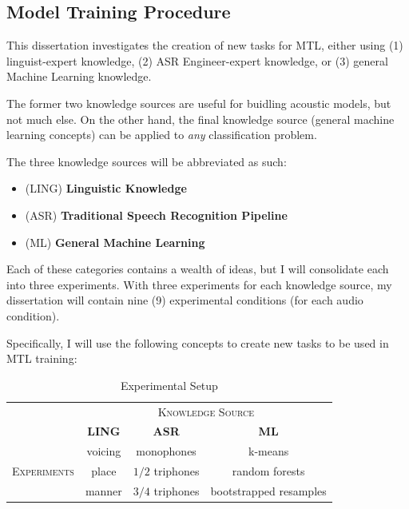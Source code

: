 \documentclass[10pt,a4paper]{article}
\begin{document}
\subsection{Model Training Procedure}

This dissertation investigates the creation of new tasks for MTL, either using (1) linguist-expert knowledge, (2) ASR Engineer-expert knowledge, or (3) general Machine Learning knowledge.

The former two knowledge sources are useful for buidling acoustic models, but not much else. On the other hand, the final knowledge source (general machine learning concepts) can be applied to \textit{any} classification problem.

The three knowledge sources will be abbreviated as such:
  
\begin{itemize}
\item  (\textsc{LING}) \textbf{Linguistic Knowledge} 
\item (\textsc{ASR}) \textbf{Traditional Speech Recognition Pipeline}
\item (\textsc{ML}) \textbf{General Machine Learning}
\end{itemize}


Each of these categories contains a wealth of ideas, but I will consolidate each into three experiments. With three experiments for each knowledge source, my dissertation will contain nine (9) experimental conditions (for each audio condition).

Specifically, I will use the following concepts to create new tasks to be used in MTL training:

\begin{table}[!htbp]
  \centering
  \begin{adjustbox}{width=.55\textwidth}
    \begin{tabular}{cccc}
      \toprule
      & \multicolumn{3}{c}{\textsc{Knowledge Source}}\\
      & \textbf{LING} & \textbf{ASR} & \textbf{ML}\\
      \midrule
      \multirow{3}{*}{\textsc{Experiments}} & voicing & monophones &  k-means \\
      & place & $1/2$ triphones & random forests  \\
      & manner & $3/4$ triphones &  bootstrapped resamples  \\
      \bottomrule
    \end{tabular}
    \label{table:data}
  \end{adjustbox}
  
  \caption{Experimental Setup}
  
\end{table}
\end{document}
